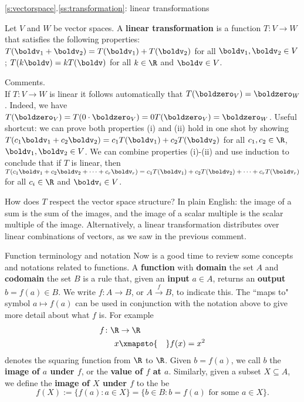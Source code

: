 \begin{frame}{\ref{s:vectorspace}.\ref{ss:transformation}: linear transformations}
\footnotesize
\begin{definition}
Let $V$ and $W$ be vector spaces. A {\bf linear transformation} is a function 
$T\colon V\rightarrow W$
that satisfies the following properties:
\bb[(i)]
\ii $T(\boldv_1+\boldv_2)=T(\boldv_1)+T(\boldv_2)$ for all $\boldv_1,\boldv_2\in V$;
\ii $T(k\boldv)=kT(\boldv)$ for all $k\in\R$ and $\boldv\in V$. 
\ee
\end{definition}
\pause
\alert{Comments}. \\
\bb
\ii If $T\colon V\rightarrow W$ is linear it follows automatically that $T(\boldzero_V)=\boldzero_W$. 
Indeed, we have  $T(\boldzero_V)=T(0\cdot\boldzero_V)=0T(\boldzero_V)=\boldzero_W$.
\pause\ii Useful shortcut: we can prove both properties (i) and (ii) hold in one shot by showing $T(c_1\boldv_1+c_2\boldv_2)=c_1T(\boldv_1)+c_2T(\boldv_2)$ for all $c_1,c_2\in\R$, $\boldv_1,\boldv_2\in V$. 
\pause\ii We can combine properties (i)-(ii) and use induction to conclude that if $T$ is linear, then 
$
T(c_1\boldv_1+c_2\boldv_2+\cdots+c_r\boldv_r)=c_1T(\boldv_1)+c_2T(\boldv_2)+\cdots+c_rT(\boldv_r)
$
for all $c_i\in\R$ and $\boldv_i\in V$. 

\pause\ii How does $T$ respect the vector space structure? In plain English: the image of a sum is the sum of the images, and the image of a scalar multiple is the scalar multiple of the image. 
\pause
Alternatively, a linear transformation \alert{distributes} over linear combinations of vectors, as we saw in the previous comment. 
\ee
\end{frame}
\begin{frame}{Function terminology and notation}
 Now is a good time to review some concepts and notations related to functions. 
 \bpause
 A {\bf function} with {\bf domain} the set $A$ and {\bf codomain} the set $B$ is a \alert{rule} that, given an {\bf input} $a\in A$, returns an {\bf output} $b=f(a)\in B$. We write $f\colon A\rightarrow B$, or $A\xrightarrow{f} B$, to indicate this. 
 \bpause 
 The ``maps to" symbol $a\mapsto f(a)$ can be used in conjunction with the notation above to give more detail about what $f$ is. For example  
 \begin{align*}
 f\colon \R&\rightarrow \R\\
 x&\xmapsto{\hspace{10pt}} f(x)=x^2
 \end{align*}
 denotes the squaring function from $\R$ to $\R$. 
 \bpause
 Given $b=f(a)$, we call $b$ the {\bf image of $a$ under $f$}, or the {\bf value of $f$ at $a$}. 
 \bspace 
 Similarly, given a subset $X\subseteq A$, we define the {\bf image of $X$ under $f$} to the be 
 \[
 f(X):=\{f(a)\colon a\in X\}=\{b\in B\colon b=f(a) \text{ for some }a\in X\}.
 \]
\end{frame}
